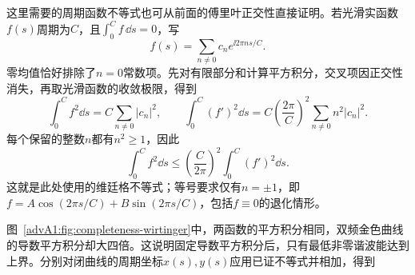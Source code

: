这里需要的周期函数不等式也可从前面的傅里叶正交性直接证明。若光滑实函数$f(s)$周期为$C$，且$\int_0^Cf\,\dd s=0$，写
\[
 f(s)=\sum_{n\ne0}c_n e^{\ii2\pi ns/C}.
\]
零均值恰好排除了$n=0$常数项。先对有限部分和计算平方积分，交叉项因正交性消失，再取光滑函数的收敛极限，得到
\[
 \int_0^C f^2\dd s=C\sum_{n\ne0}|c_n|^2,
 \qquad
 \int_0^C(f')^2\dd s
 =C\left(\frac{2\pi}C\right)^2\sum_{n\ne0}n^2|c_n|^2.
\]
每个保留的整数$n$都有$n^2\ge1$，因此
\[
 \int_0^C f^2\dd s\le
 \left(\frac C{2\pi}\right)^2\int_0^C(f')^2\dd s.
\]
这就是此处使用的维廷格不等式；等号要求仅有$n=\pm1$，即$f=A\cos(2\pi s/C)+B\sin(2\pi s/C)$，包括$f\equiv0$的退化情形。
\begin{qualityfigure}
\label{advA1:fig:completeness-wirtinger}
\end{qualityfigure}
图~\ref{advA1:fig:completeness-wirtinger}中，两函数的平方积分相同，双频金色曲线的导数平方积分却大四倍。这说明固定导数平方积分后，只有最低非零谐波能达到上界。分别对闭曲线的周期坐标$x(s),y(s)$应用已证不等式并相加，得到
